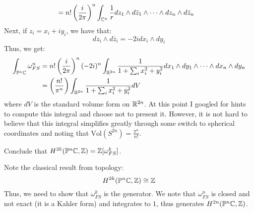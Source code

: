 \documentclass[12pt]{article}
\begin{document}
\begin{solution}
\begin{align*}
        &= n!\left(\frac{i}{2\pi}\right)^n \int_{\mathbb C^n} \frac{1}{r} dz_1 \wedge d\bar{z}_1 \wedge \cdots \wedge dz_n \wedge d\bar{z}_n
    \end{align*}
    Next, if $z_i = x_i + iy_i$, we have that:
    \[ dz_i \wedge d\bar{z}_i = -2i dx_i \wedge dy_i\]
    Thus, we get:
    \begin{align*}
        \int_{\mathbb P^n \mathbb C} \omega_{FS}^n &= n!\left(\frac{i}{2\pi}\right)^n (-2i)^n \int_{\mathbb R^{2n}} \frac{1}{1+\sum_i x_i^2+y_i^2} dx_1 \wedge dy_1 \wedge \cdots \wedge dx_n \wedge dy_n \\        
        &= \left(\frac{n!}{\pi^n}\right) \int_{\mathbb R^{2n}} \frac{1}{1+\sum_i x_i^2+y_i^2} dV
    \end{align*}
    where $dV$ is the standard volume form on $\mathbb R^{2n}$. \bbni
    At this point I googled for hints to compute this integral and choose not to present it. However, it is not hard to believe that this integral simplifies greatly through some switch to spherical coordinates and noting that $\text{Vol}(S^{2n}) = \frac{\pi^n}{n!}$.
\end{solution}
\newpage

\begin{problem}{1.5}
    Conclude that $H^{2k}(\mathbb{P}^n\mathbb C, \mathbb Z) = \mathbb Z[\omega_{FS}^k]$. 
\end{problem}
\begin{solution}
    Note the classical result from topology: 
    \[H^{2k}(\mathbb{P}^n\mathbb C, \mathbb Z) \cong \mathbb Z\] 
    Thus, we need to show that $\omega_{FS}^k$ is the generator. We note that $\omega_{FS}^n$ is closed and not exact (it is a Kahler form) and integrates to $1$, thus generates $H^{2n}(\mathbb{P}^n\mathbb C, \mathbb Z)$. \bbni
\end{solution}
\newpage
\end{document}
